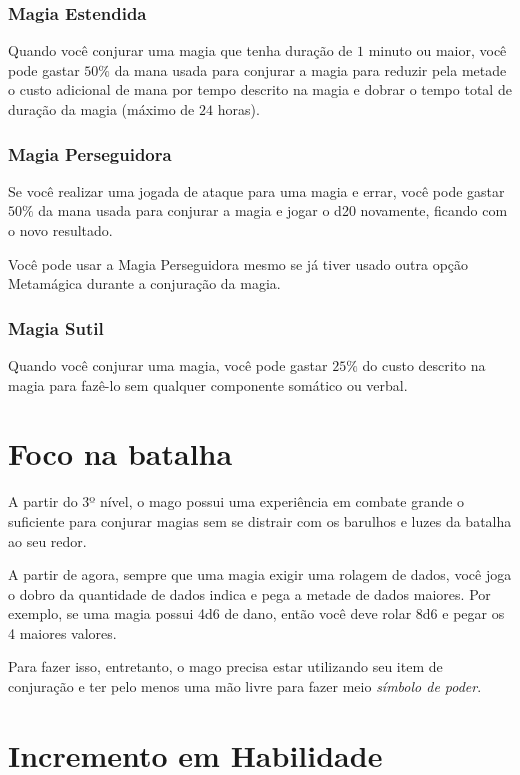 \documentclass{RPG_Adventure}[2021/10/20]
\begin{document}
\begin{multicols}{2}
\subsubsection{Magia Estendida}%

Quando você conjurar uma magia que tenha duração de $1$ minuto ou maior, você
pode gastar $50\%$ da mana usada para conjurar a magia para reduzir pela metade o
custo adicional de mana por tempo descrito na magia e dobrar o tempo total de
duração da magia (máximo de $24$ horas).

\subsubsection*{Magia Perseguidora}%

Se você realizar uma jogada de ataque para uma magia e errar, você pode gastar
$50\%$ da mana usada para conjurar a magia e jogar o d20 novamente, ficando com
o novo resultado.

Você pode usar a Magia Perseguidora mesmo se já tiver usado outra opção
Metamágica durante a conjuração da magia.

\subsubsection*{Magia Sutil}%

Quando você conjurar uma magia, você pode gastar $25\%$ do custo descrito na
magia para fazê-lo sem qualquer componente somático ou verbal.

\section*{Foco na batalha}%

A partir do 3º nível, o mago possui uma experiência em combate grande o
suficiente para conjurar magias sem se distrair com os barulhos e luzes da
batalha ao seu redor.

A partir de agora, sempre que uma magia exigir uma rolagem de dados, você joga o
dobro da quantidade de dados indica e pega a metade de dados maiores. Por
exemplo, se uma magia possui 4d6 de dano, então você deve rolar 8d6 e pegar os
4 maiores valores.

Para fazer isso, entretanto, o mago precisa estar utilizando seu item de
conjuração e ter pelo menos uma mão livre para fazer meio \textit{símbolo de
poder}.

\section*{Incremento em Habilidade}%


\end{multicols}
\end{document}
